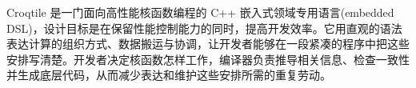 Croqtile 是一门面向高性能核函数编程的 C++ 嵌入式领域专用语言(embedded DSL)，设计目标是在保留性能控制能力的同时，提高开发效率。它用直观的语法表达计算的组织方式、数据搬运与协调，让开发者能够在一段紧凑的程序中把这些安排写清楚。开发者决定核函数怎样工作，编译器负责推导相关信息、检查一致性并生成底层代码，从而减少表达和维护这些安排所需的重复劳动。
